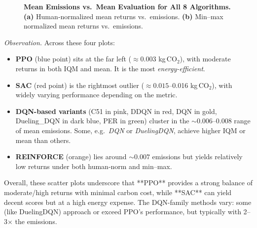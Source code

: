 \begin{figure} 
	\centering
	\quad
	\caption{\textbf{Mean Emissions vs.\ Mean Evaluation for All 8 Algorithms.}
		\textbf{(a)} Human‐normalized mean returns vs.\ emissions. 
		\textbf{(b)} Min--max normalized mean returns vs.\ emissions.}
	\label{fig:scatter_all_mean}
\end{figure}

\noindent
\emph{Observation.} Across these four plots:
\begin{itemize}
	\item \textbf{PPO} (blue point) sits at the far left (\(\approx 0.003\) kg\,CO$_2$), 
	with moderate returns in both IQM and mean. It is the most \emph{energy-efficient}.
	\item \textbf{SAC} (red point) is the rightmost outlier (\(\approx 0.015\)–0.016 kg\,CO$_2$), 
	with widely varying performance depending on the metric. 
	\item \textbf{DQN-based variants} (C51 in pink, DDQN in red, DQN in gold,
	Dueling\_DQN in dark blue, PER in green) cluster in the \(\sim0.006\)--0.008 range
	of mean emissions. Some, e.g.\ \emph{DQN} or \emph{DuelingDQN}, achieve higher 
	IQM or mean than others. 
	\item \textbf{REINFORCE} (orange) lies around \(\sim0.007\) emissions but yields 
	relatively low returns under both human‐norm and min–max.
\end{itemize}
Overall, these scatter plots underscore that **PPO** provides a strong balance of 
moderate/high returns with minimal carbon cost, while **SAC** can yield decent 
scores but at a high energy expense. The DQN-family methods vary: some (like 
DuelingDQN) approach or exceed PPO’s performance, but typically with 2--3$\times$ 
the emissions.

